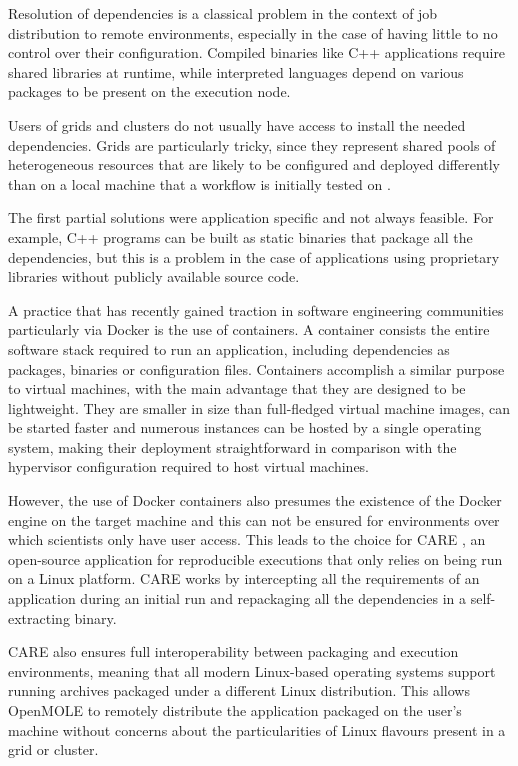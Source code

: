 Resolution of dependencies is a classical problem in the context of job distribution to remote environments, especially in the case of having little to no control over their configuration. Compiled binaries like C++ applications require shared libraries at runtime, while interpreted languages depend on various packages to be present on the execution node. 

Users of grids and clusters do not usually have access to install the needed dependencies. Grids are particularly tricky, since they represent shared pools of heterogeneous resources that are likely to be configured and deployed differently than on a local machine that a workflow is initially tested on \cite{Leclaire2016}.

The first partial solutions were application specific and not always feasible. For example, C++ programs can be built as static binaries that package all the dependencies, but this is a problem in the case of applications using proprietary libraries without publicly available source code.

A practice that has recently gained traction in software engineering communities particularly via Docker \cite{Docker} is the use of containers. A container consists the entire software stack required to run an application, including dependencies as packages, binaries or configuration files. Containers accomplish a similar purpose to virtual machines, with the main advantage that they are designed to be lightweight. They are smaller in size than full-fledged virtual machine images, can be started faster and numerous instances can be hosted by a single operating system, making their deployment straightforward in comparison with the hypervisor configuration required to host virtual machines.

However, the use of Docker containers also presumes the existence of the Docker engine on the target machine and this can not be ensured for environments over which scientists only have user access. This leads to the choice for CARE \cite{Janin2014}, an open-source application for reproducible executions that only relies on being run on a Linux platform. CARE works by intercepting all the requirements of an application during an initial run and repackaging all the dependencies in a self-extracting binary. 

CARE also ensures full interoperability between packaging and execution environments, meaning that all modern Linux-based operating systems support running archives packaged under a different Linux distribution. This allows OpenMOLE to remotely distribute the application packaged on the user's machine without concerns about the particularities of Linux flavours present in a grid or cluster.

